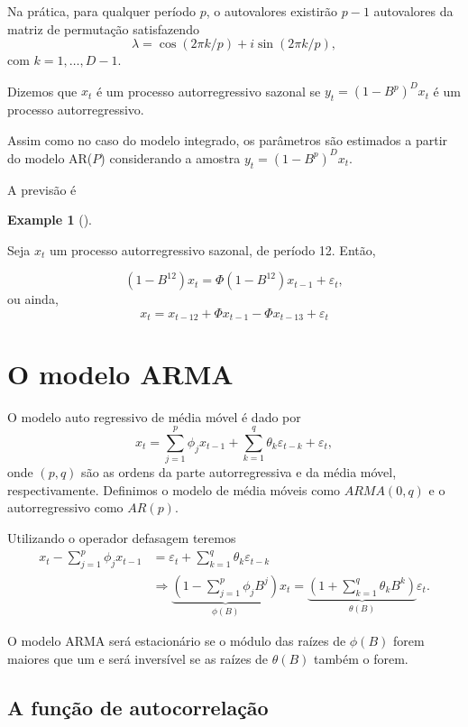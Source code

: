 \documentclass[
  letterpaper,
  DIV=11,
  numbers=noendperiod]{scrartcl}
\theoremstyle{plain}
\theoremstyle{plain}
\theoremstyle{definition}
\newtheorem{example}{Example}[chapter]
\theoremstyle{definition}
\theoremstyle{remark}
\begin{document}
Na prática, para qualquer período \(p\), o autovalores existirão \(p-1\)
autovalores da matriz de permutação satisfazendo
\[\lambda= \cos(2\pi k/p)+i\sin(2\pi k/p),\] com \(k=1,\ldots,D-1\).

Dizemos que \(x_t\) é um processo autorregressivo sazonal se
\(y_t=(1-B^p)^Dx_t\) é um processo autorregressivo.

Assim como no caso do modelo integrado, os parâmetros são estimados a
partir do modelo AR(\(P\)) considerando a amostra
\(y_t=(1-B^{p})^Dx_t\).

A previsão é

\begin{example}[]\protect\hypertarget{exm-}{}\label{exm-}

Seja \(x_t\) um processo autorregressivo sazonal, de período 12. Então,

\[(1-B^{12})x_t=\Phi(1-B^{12})x_{t-1}+\varepsilon_t,\] ou ainda,
\[x_t=x_{t-12}+\Phi x_{t-1}-\Phi x_{t-13}+\varepsilon_t\]

\end{example}

\hypertarget{o-modelo-arma}{%
\section{O modelo ARMA}\label{o-modelo-arma}}

O modelo auto regressivo de média móvel é dado por
\[  x_t= \sum_{j=1}^p \phi_j x_{t-1}  + \sum_{k=1}^{q}\theta_k\varepsilon_{t-k}+ \varepsilon_t,
\] onde \((p,q)\) são as ordens da parte autorregressiva e da média
móvel, respectivamente. Definimos o modelo de média móveis como
\(ARMA(0,q)\) e o autorregressivo como \(AR(p).\)

Utilizando o operador defasagem teremos \[\begin{align}
        x_t-\sum_{j=1}^p \phi_j x_{t-1}&= \varepsilon_t + \sum_{k=1}^{q}\theta_k\varepsilon_{t-k} \\
        &\Rightarrow 
        \underbrace{\left(1-\sum_{j=1}^p \phi_j B^j\right)}_{\phi(B)}x_{t} =  \underbrace{\left(1+\sum_{k=1}^{q}\theta_kB^k\right)}_{\theta(B)}\varepsilon_{t}.
        \end{align}\]

O modelo ARMA será estacionário se o módulo das raízes de \(\phi(B)\)
forem maiores que um e será inversível se as raízes de \(\theta(B)\)
também o forem.

\hypertarget{a-funuxe7uxe3o-de-autocorrelauxe7uxe3o}{%
\subsection{A função de
autocorrelação}\label{a-funuxe7uxe3o-de-autocorrelauxe7uxe3o}}
\end{document}
